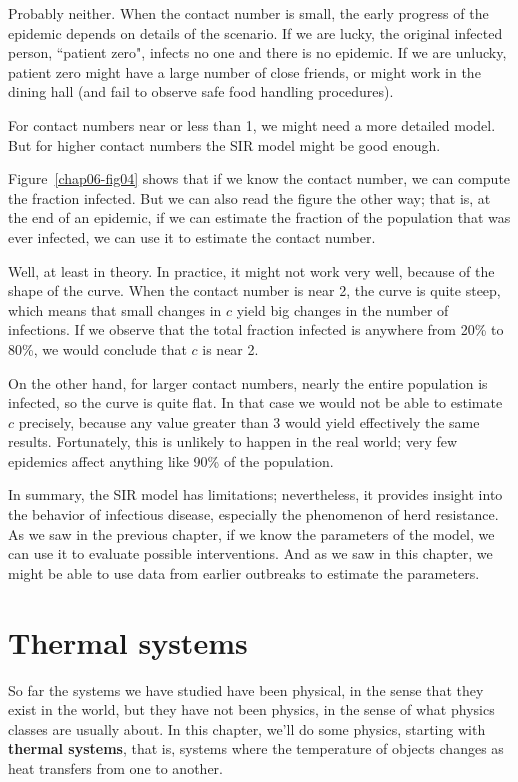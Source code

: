 \documentclass[12pt]{book}
\theoremstyle{exercise}
\begin{document}
Probably neither.  When the contact number is small, the early progress of the epidemic depends on details of the scenario.  If we are lucky, the original infected person, ``patient zero",  infects no one and there is no epidemic.  If we are unlucky, patient zero might have a large number of close friends, or might work in the dining hall (and fail to observe safe food handling procedures).

For contact numbers near or less than 1, we might need a more detailed model.  But for higher contact numbers the SIR model might be good enough.

Figure~\ref{chap06-fig04} shows that if we know the contact number, we can compute the fraction infected.  But we can also read the figure the other way; that is, at the end of an epidemic, if we can estimate the fraction of the population that was ever infected, we can use it to estimate the contact number.

Well, at least in theory.  In practice, it might not work very well, because of the shape of the curve.  When the contact number is near 2, the curve is quite steep, which means that small changes in $c$ yield big changes in the number of infections.  If we observe that the total fraction infected is anywhere from 20\% to 80\%, we would conclude that $c$ is near 2.

On the other hand, for larger contact numbers, nearly the entire population is infected, so the curve is quite flat.  In that case we would not be able to estimate $c$ precisely, because any value greater than 3 would yield effectively the same results.  Fortunately, this is unlikely to happen in the real world; very few epidemics affect anything like 90\% of the population.

In summary, the SIR model has limitations; nevertheless, it provides insight into the behavior of infectious disease, especially the phenomenon of herd resistance.  As we saw in the previous chapter, if we know the parameters of the model, we can use it to evaluate possible interventions.  And as we saw in this chapter, we might be able to use data from earlier outbreaks to estimate the parameters.



\chapter{Thermal systems}

So far the systems we have studied have been physical, in the sense that they exist in the world, but they have not been physics, in the sense of what physics classes are usually about.  In this chapter, we'll do some physics, starting with {\bf thermal systems}, that is, systems where the temperature of objects changes as heat transfers from one to another.
\end{document}
